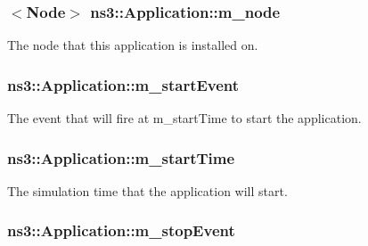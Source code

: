 \subsubsection[{\texorpdfstring{m\+\_\+node}{m_node}}]{$<${\bf Node}$>$ ns3\+::\+Application\+::m\+\_\+node\hspace{0.3cm}{\ttfamily [protected]}}\hypertarget{classns3_1_1Application_af4ba01e31858d8446b4f077911db0019}{}\label{classns3_1_1Application_af4ba01e31858d8446b4f077911db0019}


The node that this application is installed on. 

\subsubsection[{\texorpdfstring{m\+\_\+start\+Event}{m_startEvent}}]{ ns3\+::\+Application\+::m\+\_\+start\+Event\hspace{0.3cm}{\ttfamily [protected]}}\hypertarget{classns3_1_1Application_a0fbd5a73ded085bb3a79634ec36c415a}{}\label{classns3_1_1Application_a0fbd5a73ded085bb3a79634ec36c415a}


The event that will fire at m\+\_\+start\+Time to start the application. 

\subsubsection[{\texorpdfstring{m\+\_\+start\+Time}{m_startTime}}]{ ns3\+::\+Application\+::m\+\_\+start\+Time\hspace{0.3cm}{\ttfamily [protected]}}\hypertarget{classns3_1_1Application_a35d68c45777ef3123c9d5eb532e33f10}{}\label{classns3_1_1Application_a35d68c45777ef3123c9d5eb532e33f10}


The simulation time that the application will start. 

\subsubsection[{\texorpdfstring{m\+\_\+stop\+Event}{m_stopEvent}}]{ ns3\+::\+Application\+::m\+\_\+stop\+Event\hspace{0.3cm}{\ttfamily [protected]}}\hypertarget{classns3_1_1Application_a95076e3ecffd2bfe16abeef13a1a4f76}{}\label{classns3_1_1Application_a95076e3ecffd2bfe16abeef13a1a4f76}


